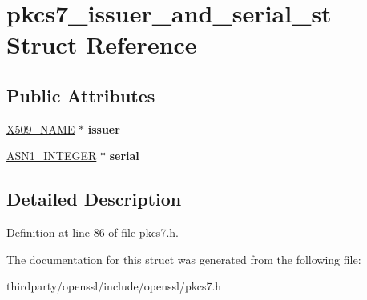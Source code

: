 \hypertarget{structpkcs7__issuer__and__serial__st}{}\section{pkcs7\+\_\+issuer\+\_\+and\+\_\+serial\+\_\+st Struct Reference}
\label{structpkcs7__issuer__and__serial__st}
\subsection*{Public Attributes}
\begin{DoxyCompactItemize}
\item 
\mbox{\label{structpkcs7__issuer__and__serial__st_ace9f7a526b2d91328ce37a1b3d26c179}} 
\hyperlink{struct_x509__name__st}{X509\+\_\+\+N\+A\+ME} $\ast$ {\bfseries issuer}
\item 
\mbox{\label{structpkcs7__issuer__and__serial__st_a46903221f3f9a3a0243bbaae23afbe98}} 
\hyperlink{structasn1__string__st}{A\+S\+N1\+\_\+\+I\+N\+T\+E\+G\+ER} $\ast$ {\bfseries serial}
\end{DoxyCompactItemize}


\subsection{Detailed Description}


Definition at line 86 of file pkcs7.\+h.



The documentation for this struct was generated from the following file\+:\begin{DoxyCompactItemize}
\item 
thirdparty/openssl/include/openssl/pkcs7.\+h\end{DoxyCompactItemize}
